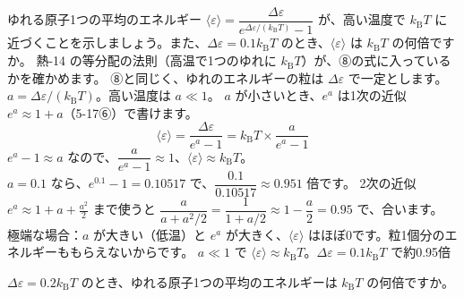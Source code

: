 \label{ph:熱-15:ex10}
\begin{phreidai}
ゆれる原子1つの平均のエネルギー $\langle\varepsilon\rangle=\dfrac{\Delta\varepsilon}{e^{\Delta\varepsilon/(k_{\mathrm B}T)}-1}$ が、高い温度で $k_{\mathrm B}T$ に近づくことを示しましょう。また、$\Delta\varepsilon=0.1k_{\mathrm B}T$ のとき、$\langle\varepsilon\rangle$ は $k_{\mathrm B}T$ の何倍ですか。
\phbamen
熱-14 の等分配の法則（高温で1つのゆれに $k_{\mathrm B}T$）が、⑧の式に入っているかを確かめます。
\phmushi
⑧と同じく、ゆれのエネルギーの粒は $\Delta\varepsilon$ で一定とします。
\phzu
$a=\Delta\varepsilon/(k_{\mathrm B}T)$。高い温度は $a\ll1$。
\phriyu
$a$ が小さいとき、$e^a$ は1次の近似 $e^a\approx1+a$（5-17⑥）で書けます。
\phtateru
\[\langle\varepsilon\rangle=\frac{\Delta\varepsilon}{e^a-1}=k_{\mathrm B}T\times\frac{a}{e^a-1}\]
\phtoku
$e^a-1\approx a$ なので、$\dfrac{a}{e^a-1}\approx1$、$\langle\varepsilon\rangle\approx k_{\mathrm B}T$。\\
$a=0.1$ なら、$e^{0.1}-1=0.10517$ で、$\dfrac{0.1}{0.10517}\approx0.951$ 倍です。
\phtashikame
2次の近似 $e^a\approx1+a+\tfrac{a^2}{2}$ まで使うと $\dfrac{a}{a+a^2/2}=\dfrac{1}{1+a/2}\approx1-\dfrac{a}{2}=0.95$ で、合います。\\
極端な場合：$a$ が大きい（低温）と $e^a$ が大きく、$\langle\varepsilon\rangle$ はほぼ0です。粒1個分のエネルギーももらえないからです。
\kotae $a\ll1$ で $\langle\varepsilon\rangle\approx k_{\mathrm B}T$。$\Delta\varepsilon=0.1k_{\mathrm B}T$ で約0.95倍
\end{phreidai}
\begin{jibun}
$\Delta\varepsilon=0.2k_{\mathrm B}T$ のとき、ゆれる原子1つの平均のエネルギーは $k_{\mathrm B}T$ の何倍ですか。
\end{jibun}

